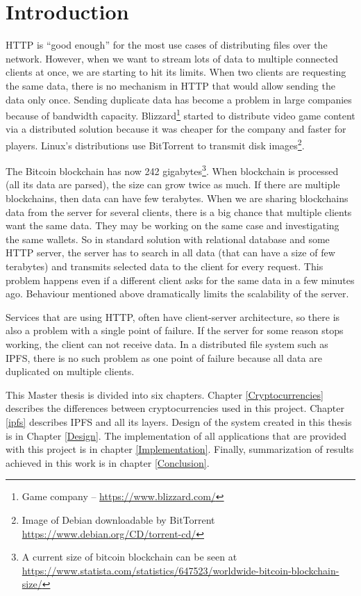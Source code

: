 \chapter{Introduction}


HTTP is ``good enough'' for the most use cases of distributing files over the network. However, when we want to stream lots of data to multiple connected clients at once, we are starting to hit its limits. When two clients are requesting the same data, there is no mechanism in HTTP that would allow sending the data only once. Sending duplicate data has become a problem in large companies because of bandwidth capacity. Blizzard\footnote{Game company -- \url{https://www.blizzard.com/}} started to distribute video game content via a distributed solution because it was cheaper for the company and faster for players\cite{BigDataInVideoGames}. Linux's distributions use BitTorrent to transmit disk images\footnote{Image of Debian downloadable by BitTorrent \url{https://www.debian.org/CD/torrent-cd/}}.

The Bitcoin blockchain has now 242 gigabytes\footnote{A current size of bitcoin blockchain can be seen at \url{https://www.statista.com/statistics/647523/worldwide-bitcoin-blockchain-size/}}. When blockchain is processed (all its data are parsed), the size can grow twice as much. If there are multiple blockchains, then data can have few terabytes. When we are sharing blockchains data from the server for several clients, there is a big chance that multiple clients want the same data. They may be working on the same case and investigating the same wallets. So in standard solution with relational database and some HTTP server, the server has to search in all data (that can have a size of few terabytes) and transmits selected data to the client for every request. This problem happens even if a different client asks for the same data in a few minutes ago. Behaviour mentioned above dramatically limits the scalability of the server.

Services that are using HTTP, often have client-server architecture, so there is also a problem with a single point of failure. If the server for some reason stops working, the client can not receive data. In a distributed file system such as IPFS, there is no such problem as one point of failure because all data are duplicated on multiple clients.

This Master thesis is divided into six chapters. Chapter \ref{Cryptocurrencies} describes the differences between cryptocurrencies used in this project. Chapter \ref{ipfs} describes IPFS and all its layers. Design of the system created in this thesis is in Chapter \ref{Design}. The implementation of all applications that are provided with this project is in chapter \ref{Implementation}. Finally, summarization of results achieved in this work is in chapter \ref{Conclusion}.
